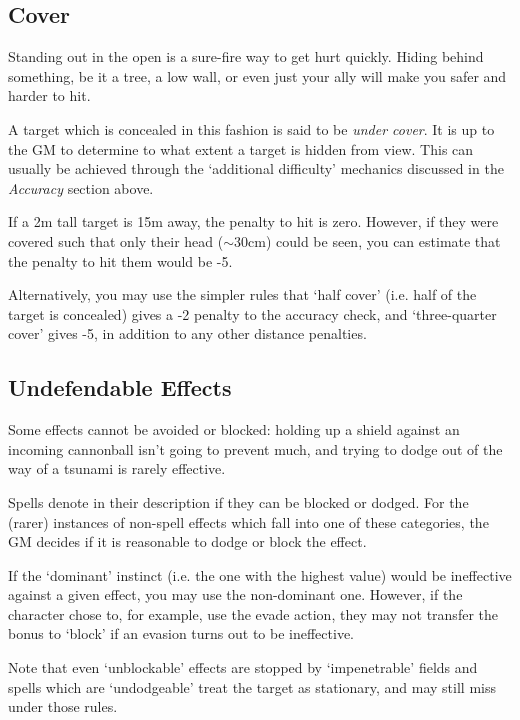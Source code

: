 \subsection{Cover}

Standing out in the open is a sure-fire way to get hurt quickly. Hiding behind something, be it a tree, a low wall, or even just your ally will make you safer and harder to hit. 

A target which is concealed in this fashion is said to be {\it under cover}. It is up to the GM to determine to what extent a target is hidden from view. This can usually be achieved through the `additional difficulty' mechanics discussed in the {\it Accuracy} section above. 

If a 2m tall target is 15m away, the penalty to hit is zero. However, if they were covered such that only their head ($\sim 30$cm) could be seen, you can estimate that the penalty to hit them would be -5.

Alternatively, you may use the simpler rules that `half cover' (i.e. half of the target is concealed) gives a -2 penalty to the accuracy check, and `three-quarter cover' gives -5, in addition to any other distance penalties. 

\subsection{Undefendable Effects}

Some effects cannot be avoided or blocked: holding up a shield against an incoming cannonball isn't going to prevent much, and trying to dodge out of the way of a tsunami is rarely effective. 

Spells denote in their description if they can be blocked or dodged. For the (rarer) instances of non-spell effects which fall into one of these categories, the GM decides if it is reasonable to dodge or block the effect. 

If the `dominant' instinct (i.e. the one with the highest value) would be ineffective against a given effect, you may use the non-dominant one. However, if the character chose to, for example, use the evade action, they may not transfer the bonus to `block' if an evasion turns out to be ineffective. 

Note that even `unblockable' effects are stopped by `impenetrable' fields and spells which are `undodgeable' treat the target as stationary, and may still miss under those rules. 



